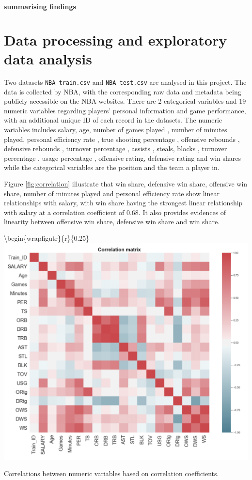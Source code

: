 \documentclass[letterpaper,12pt,twoside,]{pinp}
\begin{document}
\textbf{summarising findings}

\hypertarget{data-processing-and-exploratory-data-analysis}{%
\section{Data processing and exploratory data
analysis}\label{data-processing-and-exploratory-data-analysis}}

Two datasets \texttt{NBA\_train.csv} and \texttt{NBA\_test.csv} are
analysed in this project. The data is collected by NBA, with the
corresponding raw data and metadata being publicly accessible on the NBA
websites. There are 2 categorical variables and 19 numeric variables
regarding players' personal information and game performance, with an
additional unique ID of each record in the datasets. The numeric
variables includes salary, age, number of games played , number of
minutes played, personal efficiency rate , true shooting percentage ,
offensive rebounds , defensive rebounds , turnover percentage , assists
, steals, blocks , turnover percentage , usage percentage , offensive
rating, defensive rating and win shares while the categorical variables
are the position and the team a player in.

Figure \ref{fig:correlation} illustrate that win share, defensive win
share, offensive win share, number of minutes played and personal
efficiency rate show linear relationships with salary, with win share
having the strongest linear relationship with salary at a correlation
coefficient of 0.68. It also provides evidences of linearity between
offensive win share, defensive win share and win share.

\textbackslash{}begin\{wrapfigutr\}\{r\}\{0.25\textwidth\}
\includegraphics[width=0.6\linewidth]{correlation.png} \centering

\caption{Correlations between numeric variables based on correlation coefficients.}
\label{fig:correlation}
\end{document}
